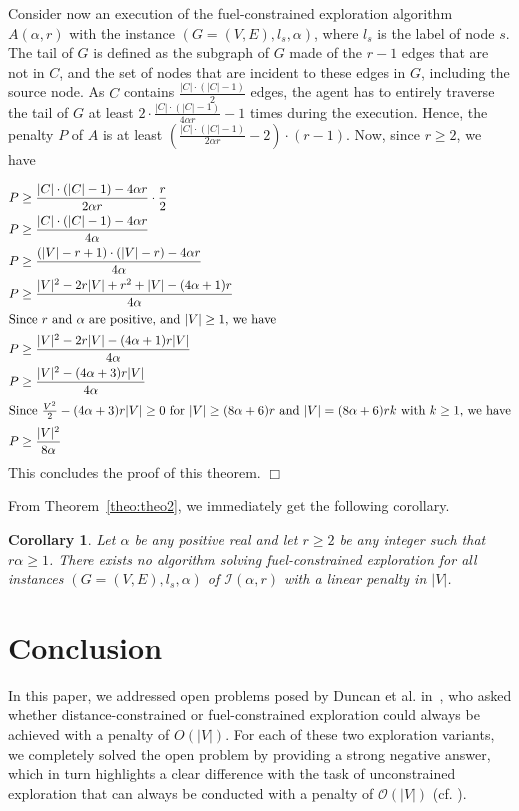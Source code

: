\documentclass[11pt]{article}
\newtheorem{corollary}{Corollary}[section]
\newcommand{\qed}{\hfill $\Box$ \bigbreak}
\newenvironment{proof}{\noindent {\bf Proof.}}{\qed}
\begin{document}
{\begin{proof}
  Consider now an execution of the fuel-constrained exploration algorithm $A(\alpha,r)$ with the instance $(G=(V,E),l_s,\alpha)$, where $l_s$ is the label of node $s$. The tail of $G$ is defined as the subgraph of $G$ made of the $r-1$ edges that are not in $C$, and the set of nodes that are incident to these edges in $G$, including the source node.
  As $C$ contains $\frac{|C|\cdot (|C|-1)}{2}$ edges,  the agent has to entirely traverse the tail of $G$ at least $2\cdot \frac{|C|\cdot (|C|-1)}{4\alpha r}-1$ times during the execution. Hence, the penalty $P$ of $A$ is at least $\left(\frac{|C|\cdot (|C|-1)}{2\alpha r}-2\right) \cdot (r-1)$. Now, since $r \geq 2$, we have

  \begin{align*}
    P & \geq \frac{|C|\cdot (|C|-1)-4\alpha r}{2\alpha r} \cdot \frac{r}{2}\\
    P & \geq \frac{|C|\cdot (|C|-1)-4\alpha r}{4\alpha}\\
    P & \geq \frac{(|V|-r+1)\cdot (|V|-r)-4\alpha r}{4\alpha}\\
    P & \geq \frac{|V|^2-2r|V|+r^2+|V|-(4\alpha+1)r}{4\alpha}\\
    \intertext{Since $r$ and $\alpha$ are positive, and $|V|\geq 1$, we have}
    P & \geq \frac{|V|^2-2r|V|-(4\alpha+1)r|V|}{4\alpha}\\
    P & \geq \frac{|V|^2-(4\alpha+3)r|V|}{4\alpha}\\
  \intertext{Since $\frac{V^2}{2}-(4\alpha+3)r|V| \geq 0$ for $|V| \geq (8\alpha+6)r$ and $|V| = (8\alpha+6)rk$ with $k \geq 1$, we have}
    P & \geq \frac{|V|^2}{8\alpha}\\
\end{align*}
This concludes the proof of this theorem.
\end{proof}

From Theorem~\ref{theo:theo2}, we immediately get the following corollary.

\begin{corollary}
\label{col:col2}
Let $\alpha$ be any positive real and let $r\geq 2$ be any integer such that $r\alpha\geq 1$. There exists no algorithm solving fuel-constrained exploration for all instances $(G=(V,E),l_s,\alpha)$ of $\mathcal{I}(\alpha,r)$ with a linear penalty in $|V|$.
\end{corollary}

\section{Conclusion}
In this paper, we addressed open problems posed by Duncan et al. in~\cite{DuncanKK06}, who asked whether distance-constrained or fuel-constrained exploration could always be achieved with a penalty of \(O(|V|)\). For each of these two exploration variants, we completely solved the open problem by providing a strong negative answer, which in turn highlights a clear difference with the task of unconstrained exploration that can always be conducted with a penalty of $\mathcal{O}(|V|)$ (cf. \cite{PanaiteP99}).

}
\end{document}
